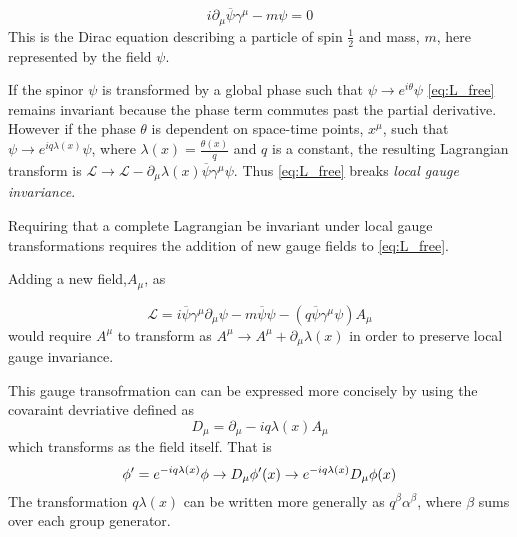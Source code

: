 \begin{equation}
 i\partial_{\mu}\overline{\psi}\gamma^{\mu} -  m\psi = 0
\end{equation}
This is the Dirac equation describing a particle of spin $\frac{1}{2}$ and mass, $m$, here represented by the field $\psi$. 

If the spinor $\psi$ is transformed by a global phase such that $\psi \to e^{i\theta}\psi$ \autoref{eq:L_free} remains invariant because the phase term commutes past the partial derivative. However if the phase $\theta$ is dependent on space-time points, $x^{\mu}$, such that $\psi \to e^{iq\lambda(x)}\psi$, where $\lambda(x) = \frac{\theta(x)}{q}$ and $q$ is a constant, the resulting Lagrangian transform is $\mathcal{L} \to \mathcal{L} - \partial_{\mu}\lambda(x)\overline{\psi}\gamma^{\mu}\psi$. Thus \autoref{eq:L_free} breaks \emph{local gauge invariance}.

Requiring that a complete Lagrangian be invariant under local gauge transformations requires the addition of new gauge fields to \autoref{eq:L_free}.

Adding a new field,$A_{\mu}$, as

\begin{equation}
  \label{eq:L_free}
  \mathcal{L} = i\overline{\psi}\gamma^{\mu}\partial_{\mu}\psi - m\overline{\psi}\psi - (q\overline{\psi}\gamma^{\mu}\psi)A_{\mu}
\end{equation}
would require $A^{\mu}$ to transform as $A^{\mu} \to A^{\mu} + \partial_{\mu}\lambda(x)$ in order to preserve local gauge invariance.

This gauge transofrmation can can be expressed more concisely by using the covaraint devriative defined as
\begin{equation}
 D_{\mu} = \partial_{\mu} - iq\lambda(x)A_{\mu}
\end{equation}
which transforms as the field itself.
That is %
\begin{equation}
  \phi^\prime  = e^{-iq\lambda(x)}\phi\\
  \rightarrow D_{\mu}\phi^\prime(x) \to e^{-iq\lambda(x)}D_{\mu}\phi(x)
\end{equation}
The transformation $q\lambda(x)$ can be written more generally as $q^{\beta}\alpha^{\beta}$, where $\beta$ sums over each group generator.


